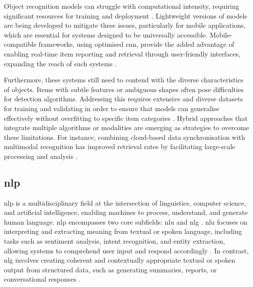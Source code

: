 Object recognition models can struggle with computational intensity, requiring significant resources for training and deployment \cites{Lubna2021, Mezhenin2021}. Lightweight versions of models are being developed to mitigate these issues, particularly for mobile applications, which are essential for systems designed to be universally accessible. Mobile-compatible frameworks, using optimised \ac{cnn}, provide the added advantage of enabling real-time item reporting and retrieval through user-friendly interfaces, expanding the reach of such systems \cites{Stout2024, Ghazal2016}.

Furthermore, these systems still need to contend with the diverse characteristics of objects. Items with subtle features or ambiguous shapes often pose difficulties for detection algorithms. Addressing this requires extensive and diverse datasets for training and validating in order to ensure that models can generalise effectively without overfitting to specific item categories \cites{Prawira2024, Liu2022, Sharma2024}. Hybrid approaches that integrate multiple algorithms or modalities are emerging as strategies to overcome these limitations. For instance, combining cloud-based data synchronisation with multimodal recognition has improved retrieval rates by facilitating large-scale processing and analysis \cite{Liu2024, Vedanth2024}.

\subsection{\acl{nlp}} \label{subsec:nlp}

\ac{nlp} is a multidisciplinary field at the intersection of linguistics, computer science, and artificial intelligence, enabling machines to process, understand, and generate human language. \ac{nlp} encompasses two core subfields: \ac{nlu} and \ac{nlg} \cite{Khurana2023}. \ac{nlu} focuses on interpreting and extracting meaning from textual or spoken language, including tasks such as sentiment analysis, intent recognition, and entity extraction, allowing systems to comprehend user input and respond accordingly \cite{Khurana2023}. In contrast, \ac{nlg} involves creating coherent and contextually appropriate textual or spoken output from structured data, such as generating summaries, reports, or conversational responses \cite{Dong2021}.

